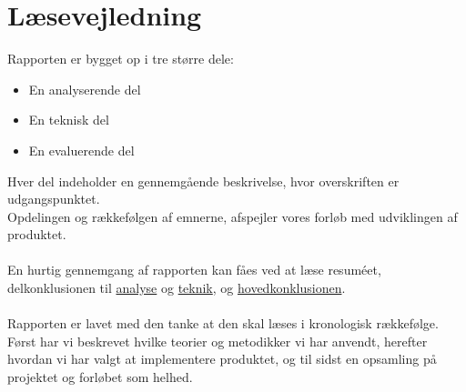 \section{Læsevejledning}
Rapporten er bygget op i tre større dele:
\begin{itemize}
    \item{En analyserende del}
    \item{En teknisk del}
    \item{En evaluerende del}
\end{itemize}
Hver del indeholder en gennemgående beskrivelse, hvor overskriften er udgangspunktet.
\\
Opdelingen og rækkefølgen af emnerne, afspejler vores forløb med udviklingen af produktet.
\\\\
En hurtig gennemgang af rapporten kan fåes ved at læse resuméet, delkonklusionen til \hyperlink{delkonklusion-analyse}{analyse} og \hyperlink{delkonklusion-teknik}{teknik}, og \hyperlink{konklusion}{hovedkonklusionen}.
\\\\
Rapporten er lavet med den tanke at den skal læses i kronologisk rækkefølge.\\
Først har vi beskrevet hvilke teorier og metodikker vi har anvendt, herefter hvordan vi har valgt at implementere produktet,
og til sidst en opsamling på projektet og forløbet som helhed.

